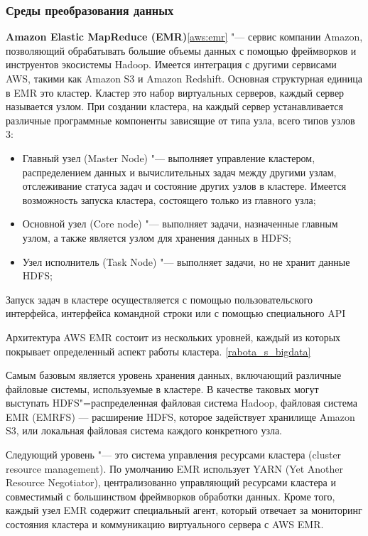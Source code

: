 \documentclass[bachelor, och, pract]{SCWorks}
\begin{document}
\subsubsection{Среды преобразования данных}
\textbf{Amazon Elastic MapReduce (EMR)}\ref{aws:emr} "--- сервис компании Amazon, позволяющий обрабатывать большие объемы данных с помощью фреймворков и инструентов экосистемы Hadoop. Имеется интеграция с другими сервисами AWS, такими как Amazon S3 и Amazon Redshift. Основная структурная единица в EMR это кластер. Кластер это набор виртуальных серверов, каждый сервер называется узлом. При создании кластера, на каждый сервер устанавливается различные программные компоненты зависящие от типа узла, всего типов узлов 3:
\begin{itemize}
	\item Главный узел (Master Node) "--- выполняет управление кластером, распределением данных и вычислительных задач между другими узлам, отслеживание статуса задач и состояние других узлов в кластере. Имеется возможность запуска кластера, состоящего только из главного узла;
	\item Основной  узел (Core node) "--- выполняет задачи, назначенные главным узлом, а также является узлом для хранения данных в HDFS;
	\item Узел исполнитель (Task Node) "--- выполняет задачи, но не хранит данные HDFS;
\end{itemize}

Запуск задач в кластере осуществляется с помощью пользовательского интерфейса, интерфейса командной строки или с помощью специального API

Архитектура AWS EMR состоит из нескольких уровней, каждый из которых покрывает определенный аспект работы кластера. \ref{rabota_s_bigdata}

Самым базовым является уровень хранения данных, включающий различные файловые системы, используемые в кластере. В качестве таковых могут выступать HDFS"=распределенная файловая система Hadoop, файловая система EMR (EMRFS) — расширение HDFS, которое задействует хранилище Amazon S3, или локальная файловая система каждого конкретного узла.

Следующий уровень "--- это система управления ресурсами кластера (cluster resource management). По умолчанию EMR использует YARN (Yet Another Resource Negotiator), централизованно управляющий ресурсами кластера и совместимый с большинством фреймворков обработки данных. Кроме того, каждый узел EMR содержит специальный агент, который отвечает за мониторинг состояния кластера и коммуникацию виртуального сервера с AWS EMR.
\end{document}
